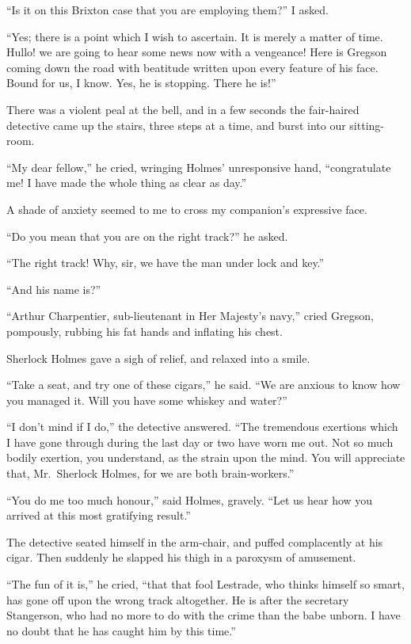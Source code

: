 \documentclass[12pt,english,oneside]{book}
\begin{document}
{}``Is it on this Brixton case that you are employing them?'' I
asked.

{}``Yes; there is a point which I wish to ascertain. It is merely
a matter of time. Hullo! we are going to hear some news now with a
vengeance! Here is Gregson coming down the road with beatitude written
upon every feature of his face. Bound for us, I know. Yes, he is stopping.
There he is!''

There was a violent peal at the bell, and in a few seconds the fair-haired
detective came up the stairs, three steps at a time, and burst into
our sitting-room.

{}``My dear fellow,'' he cried, wringing Holmes' unresponsive hand,
{}``congratulate me! I have made the whole thing as clear as day.''

A shade of anxiety seemed to me to cross my companion's expressive
face.

{}``Do you mean that you are on the right track?'' he asked.

{}``The right track! Why, sir, we have the man under lock and key.''

{}``And his name is?''

{}``Arthur Charpentier, sub-lieutenant in Her Majesty's navy,''
cried Gregson, pompously, rubbing his fat hands and inflating his
chest.

Sherlock Holmes gave a sigh of relief, and relaxed into a smile.

{}``Take a seat, and try one of these cigars,'' he said. {}``We
are anxious to know how you managed it. Will you have some whiskey
and water?''

{}``I don't mind if I do,'' the detective answered. {}``The tremendous
exertions which I have gone through during the last day or two have
worn me out. Not so much bodily exertion, you understand, as the strain
upon the mind. You will appreciate that, Mr.\ Sherlock Holmes, for
we are both brain-workers.''

{}``You do me too much honour,'' said Holmes, gravely. {}``Let
us hear how you arrived at this most gratifying result.''

The detective seated himself in the arm-chair, and puffed complacently
at his cigar. Then suddenly he slapped his thigh in a paroxysm of
amusement.

{}``The fun of it is,'' he cried, {}``that that fool Lestrade,
who thinks himself so smart, has gone off upon the wrong track altogether.
He is after the secretary Stangerson, who had no more to do with the
crime than the babe unborn. I have no doubt that he has caught him
by this time.''
\end{document}
